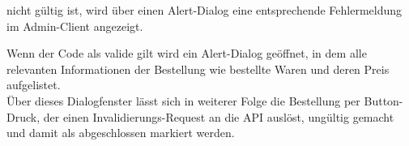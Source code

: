 nicht gültig ist, wird über einen Alert-Dialog eine entsprechende Fehlermeldung im Admin-Client
angezeigt.

Wenn der Code als valide gilt wird ein Alert-Dialog geöffnet, in dem alle relevanten Informationen
der Bestellung wie bestellte Waren und deren Preis aufgelistet.\\
Über dieses Dialogfenster lässt sich in weiterer Folge die Bestellung per Button-Druck, der einen
Invalidierungs-Request an die API auslöst, ungültig gemacht und damit als abgeschlossen markiert 
werden.